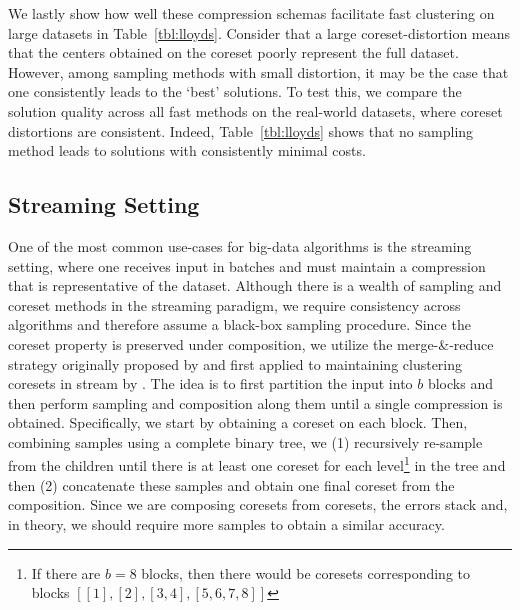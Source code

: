 We lastly show how well these compression schemas facilitate fast clustering on large datasets in Table~\ref{tbl:lloyds}. Consider that a large
coreset-distortion means that the centers obtained on the coreset poorly represent the full dataset. However, among sampling methods with small distortion, it
may be the case that one consistently leads to the `best' solutions. To test this, we compare the solution quality across all fast methods on the real-world
datasets, where coreset distortions are consistent. Indeed, Table~\ref{tbl:lloyds} shows that no sampling method leads to solutions with consistently minimal
costs.

\subsection{Streaming Setting}
\label{ssec:streaming}



One of the most common use-cases for big-data algorithms is the streaming setting, where one receives input in batches and must maintain a compression that is
representative of the dataset. Although there is a wealth of sampling and coreset methods in the streaming paradigm, we require consistency across algorithms
and therefore assume a black-box sampling procedure. Since the coreset property is preserved under composition, we utilize the merge-\&-reduce strategy
originally proposed by \cite{BS80} and first applied to maintaining clustering coresets in stream by \cite{HaM04}. The idea is to first partition the input into
$b$ blocks and then perform sampling and composition along them until a single compression is obtained. Specifically, we start by obtaining a coreset on each
block. Then, combining samples using a complete binary tree, we (1) recursively re-sample from the children until there is at least one coreset for each
level\footnote{If there are $b=8$ blocks, then there would be coresets corresponding to blocks $[[1], [2], [3, 4], [5, 6, 7, 8]]$} in the tree and then (2)
concatenate these samples and obtain one final coreset from the composition. Since we are composing coresets from coresets, the errors stack and, in theory, we
should require more samples to obtain a similar accuracy.

